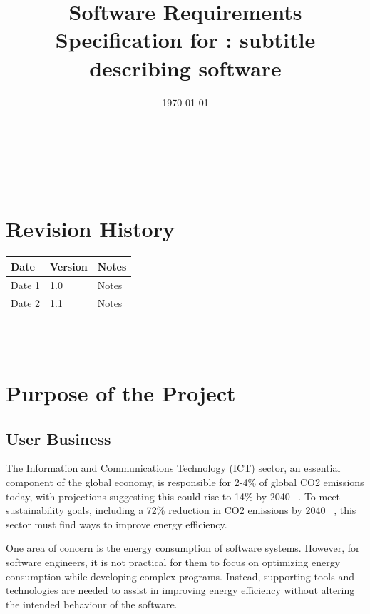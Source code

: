 \documentclass[12pt]{article}
\begin{document}

\title{Software Requirements Specification for \progname: subtitle describing software} 
\author{\authname}
\date{\today}
	
\maketitle
\thispagestyle{empty}

~\newpage

\tableofcontents

~\newpage

\section*{Revision History}

\begin{tabularx}{\textwidth}{p{3cm}p{2cm}X}
\toprule {\textbf{Date}} & {\textbf{Version}} & {\textbf{Notes}}\\
\midrule
Date 1 & 1.0 & Notes\\
Date 2 & 1.1 & Notes\\
\bottomrule
\end{tabularx}

~\\

~\newpage
{}

\section{Purpose of the Project}
\subsection{User Business}
The Information and Communications Technology (ICT) sector, an essential component of the global economy, is responsible for 2-4\% of global CO2 emissions today, with projections suggesting this could rise to 14\% by 2040 ~\citep{BelkhirAndElmeligi2018}. To meet sustainability goals, including a 72\% reduction in CO2 emissions by 2040 ~\citep{FreitagAndBernersLee2021}, this sector must find ways to improve energy efficiency.

One area of concern is the energy consumption of software systems. However, for software engineers, it is not practical for them to focus on optimizing energy consumption while developing complex programs. Instead, supporting tools and technologies are needed to assist in improving energy efficiency without altering the intended behaviour of the software.
\end{document}
